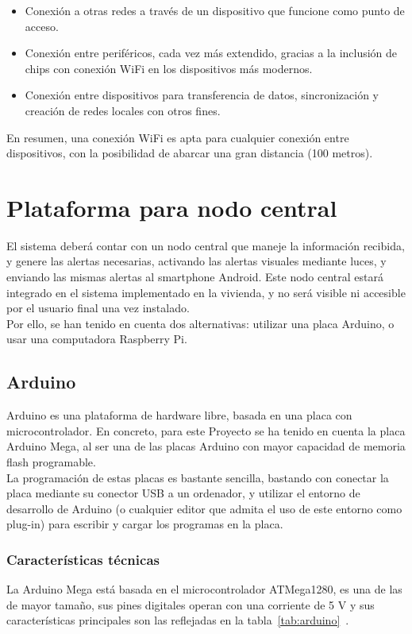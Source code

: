         \begin{itemize}
            \item Conexión a otras redes a través de un dispositivo que funcione como punto de acceso.
            \item Conexión entre periféricos, cada vez más extendido, gracias a la inclusión de chips con conexión WiFi en los dispositivos más modernos.
            \item Conexión entre dispositivos para transferencia de datos, sincronización y creación de redes locales con otros fines.
        \end{itemize}

        En resumen, una conexión WiFi es apta para cualquier conexión entre dispositivos, con la posibilidad de abarcar una gran distancia (100 metros).


\section{Plataforma para nodo central}
    El sistema deberá contar con un nodo central que maneje la información recibida, y genere las alertas necesarias, activando las alertas visuales mediante luces, y enviando las mismas alertas al smartphone Android. Este nodo central estará integrado en el sistema implementado en la vivienda, y no será visible ni accesible por el usuario final una vez instalado. \\

    Por ello, se han tenido en cuenta dos alternativas: utilizar una placa Arduino, o usar una computadora Raspberry Pi.

    \subsection{Arduino}
        Arduino es una plataforma de hardware libre, basada en una placa con microcontrolador. En concreto, para este Proyecto se ha tenido en cuenta la placa Arduino Mega, al ser una de las placas Arduino con mayor capacidad de memoria flash programable. \\

        La programación de estas placas es bastante sencilla, bastando con conectar la placa mediante su conector USB a un ordenador, y utilizar el entorno de desarrollo de Arduino (o cualquier editor que admita el uso de este entorno como plug-in) para escribir y cargar los programas en la placa.

        \subsubsection{Características técnicas}
        La Arduino Mega está basada en el microcontrolador ATMega1280, es una de las de mayor tamaño, sus pines digitales operan con una corriente de 5 V y sus características principales son las reflejadas en la tabla~\ref{tab:arduino}~\cite{megaspecs}.

